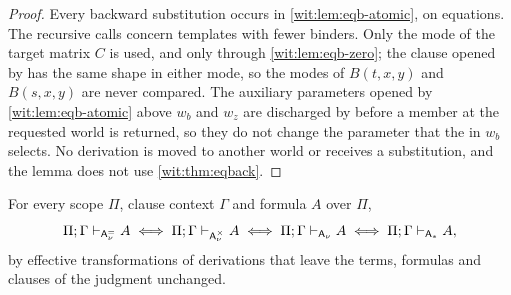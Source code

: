 \begin{proof}
Every backward substitution occurs in \cref{wit:lem:eqb-atomic}, on
equations.  The recursive calls concern templates with fewer binders.  Only
the mode of the target matrix $C$ is used, and only through
\cref{wit:lem:eqb-zero}; the clause opened by  has the same
shape in either mode, so the modes of $B(t,x,y)$ and $B(s,x,y)$ are never
compared.  The auxiliary parameters opened by \cref{wit:lem:eqb-atomic} above
$w_b$ and $w_z$ are discharged by  before a member at the
requested world is returned, so they do not change the parameter that the
 in $w_b$ selects.  No derivation is moved to another world
or receives a substitution, and the lemma does not use
\cref{wit:thm:eqback}.
\end{proof}

\begin{theorem}
\label{wit:thm:eqback}
For every scope $\Pi$, clause context $\Gamma$ and formula $A$ over $\Pi$,
\[
 \Pi;\Gamma\vdash_{\mathsf{A}^{=}_{\nu}}A
 \iff \Pi;\Gamma\vdash_{\mathsf{A}^{\times}_{\nu}}A
 \iff \Pi;\Gamma\vdash_{\mathsf{A}_{\nu}}A
 \iff \Pi;\Gamma\vdash_{\mathsf{A}_{\ast}}A ,
\]
by effective transformations of derivations that leave the terms, formulas
and clauses of the judgment unchanged.
\end{theorem}

